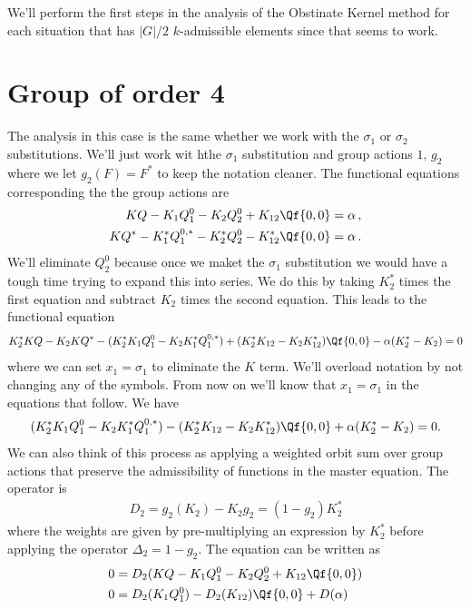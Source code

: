 We'll perform the first steps in the analysis of the Obstinate Kernel method for each situation that has $|G|/2$ $k$-admissible elements since that seems to work.
\section{Group of order 4}
The analysis in this case is the same whether we work with the $\sigma_1$ or $\sigma_2$ substitutions. We'll just work wit hthe $\sigma_1$ substitution and group actions $1,\, g_2$ where we let $g_2(F) = F^\ast$ to keep the notation cleaner. The functional equations corresponding the the group actions are
\begin{align}
	KQ - K_1 Q_1^0 - K_2 Q_2^0 + K_{12}\Qf{0,0} &= \alpha\,,\\
	KQ^\ast - K_1^\ast Q_1^{0,\ast}- K_2^\ast Q_2^0 - K_{12}^\ast \Qf{0,0} &= \alpha\,.
\end{align}
We'll eliminate $Q_2^0$ because once we maket the $\sigma_1$ substitution we would have a tough time trying to expand this into series. We do this by taking $K_2^\ast$ times the first equation and subtract $K_2$ times the second equation. This leads to the functional equation
\begin{align}
	K_2^\ast KQ - K_2 K Q^\ast- (K_2^\ast K_1 Q_1^0 - K_2 K_1^\ast Q_1^{0,\ast}) + (K_2^\ast K_{12}-K_2 K_{12}^\ast)\Qf{0,0} - \alpha(K_2^\ast - K_2) = 0
\end{align}
where we can set $x_1 = \sigma_1$ to eliminate the $K$ term. We'll overload notation by not changing any of the symbols. From now on we'll know that $x_1 = \sigma_1$ in the equations that follow. We have
\begin{align}
	(K_2^\ast K_1 Q_1^0 - K_2 K_1^\ast Q_1^{0,\ast}) - (K_2^\ast K_{12}-K_2 K_{12}^\ast)\Qf{0,0} + \alpha(K_2^\ast - K_2) = 0.
\end{align}
We can also think of this process as applying a weighted orbit sum over group actions that preserve the admissibility of functions in the master equation. The operator is
\begin{align}
	D_2 = g_2(K_2) - K_2 g_2 = (1-g_2)K_2^\ast
\end{align}
where the weights are given by pre-multiplying an expression by $K_2^\ast$ before applying the operator $\Delta_2 = 1-g_2$. The equation can be written as
\begin{align}\begin{split}
	0 &= D_2(KQ - K_1 Q_1^0 - K_2 Q_2^0 + K_{12}\Qf{0,0})\\
	0 &= D_2(K_1Q_1^0) - D_2(K_{12})\Qf{0,0} + D(\alpha)	    
\end{split}\end{align}
